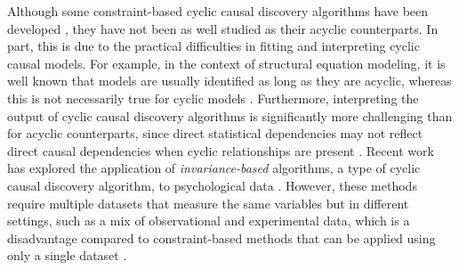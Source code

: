 \documentclass[twoside, 11pt]{article}
\begin{document}
Although some constraint-based cyclic causal discovery algorithms have been developed \citep{mooij_classen2020, richardson1996, strobl2019}, they have not been as well studied as their acyclic counterparts. In part, this is due to the practical difficulties in fitting and interpreting cyclic causal models. 
For example, in the context of structural equation modeling, it is well known that models are usually identified as long as they are acyclic, whereas this is not necessarily true for cyclic models \citep{Bongers2021, bollen_structural_1989}.
Furthermore, interpreting the output of cyclic causal discovery algorithms is significantly more challenging than for acyclic counterparts, since direct statistical dependencies may not reflect direct causal dependencies when cyclic relationships are present \citep{bongers2018theoretical, hyttinen_discovering_2013}. 
Recent work has explored the application of \textit{invariance-based} algorithms, a type of cyclic causal discovery algorithm, to psychological data \citep{Kossakowski2021}. However, these methods require multiple datasets that measure the same variables but in different settings, such as a mix of observational and experimental data, which is a disadvantage compared to constraint-based methods that can be applied using only a single dataset \citep{peters_causal_2016, Glymour2019}.
\end{document}
